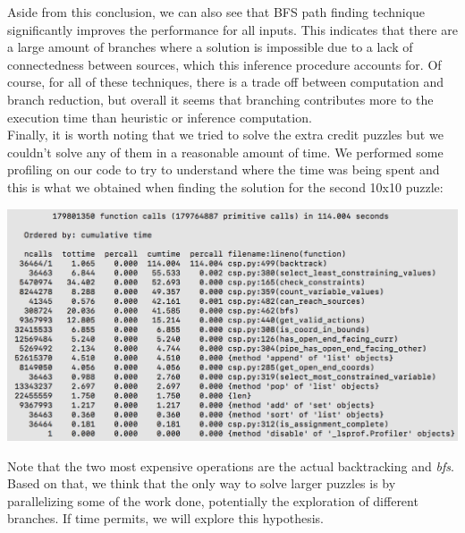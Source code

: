 \documentclass[11pt]{article}
\begin{document}
Aside from this conclusion, we can also see that BFS path finding technique significantly improves the performance for all inputs. This indicates that there are a large amount of branches where a solution is impossible due to a lack of connectedness between sources, which this inference procedure accounts for. Of course, for all of these techniques, there is a trade off between computation and branch reduction, but overall it seems that branching contributes more to the execution time than heuristic or inference computation.\\

Finally, it is worth noting that we tried to solve the extra credit puzzles but we couldn't solve any of them in a reasonable amount of time. We performed some profiling on our code to try to understand where the time was being spent and this is what we obtained when finding the solution for the second 10x10 puzzle:
\begin{center}
\includegraphics[scale=0.6]{part1/profile.png}
\end{center}

Note that the two most expensive operations are the actual backtracking and \textit{bfs}. Based on that, we think that the only way to solve larger puzzles is by parallelizing some of the work done, potentially the exploration of different branches. If time permits, we will explore this hypothesis.\\
\end{document}
